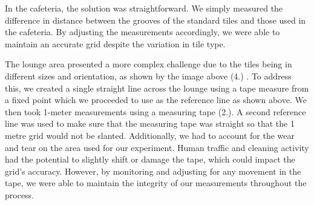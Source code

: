 \documentclass[conference]{IEEEtran}
\begin{document}
	In the cafeteria, the solution was straightforward. We simply measured the difference in distance between the grooves of the standard tiles and those used in the cafeteria. By adjusting the measurements accordingly, we were able to maintain an accurate grid despite the variation in tile type.
	

	
	The lounge area presented a more complex challenge due to the tiles being in different sizes and orientation, as shown by the image above (4.) . To address this, we created a single straight line across the lounge using a tape measure from a fixed point which we proceeded to use as the reference line as shown above. We then took 1-meter measurements using a measuring tape (2.). A second reference line was used to make sure that the measuring tape was straight so that the 1 metre grid would not be slanted.
	Additionally, we had to account for the wear and tear on the area used for our experiment. Human traffic and cleaning activity had the potential to slightly shift or damage the tape, which could impact the grid's accuracy. However, by monitoring and adjusting for any movement in the tape, we were able to maintain the integrity of our measurements throughout the process.
	
\end{document}
